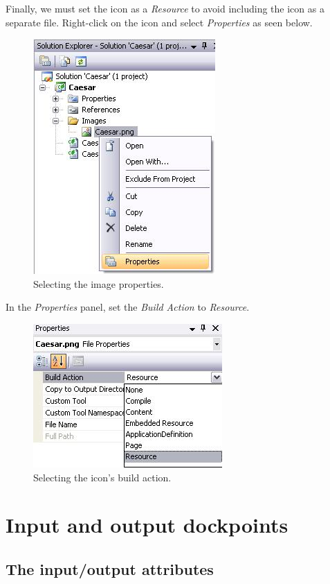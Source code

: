 Finally, we must set the icon as a \textit{Resource} to avoid including the icon as a separate file. Right-click on the icon and select \textit{Properties} as seen below.

\begin{figure}[h!]
	\centering
		\includegraphics{figures/icon_properties.jpg}
	\caption{Selecting the image properties.}
	\label{fig:icon_properties}
\end{figure}

In the \textit{Properties} panel, set the \textit{Build Action} to \textit{Resource}.

\begin{figure}[h!]
	\centering
		\includegraphics{figures/icon_build_action.jpg}
	\caption{Selecting the icon's build action.}
	\label{fig:icon_build_action}
\end{figure}
\clearpage

\section{Input and output dockpoints}
\label{sec:InputAndOutputDockpoints}

\subsection{The input/output attributes}
\label{sec:TheInputOutputAttributes}

